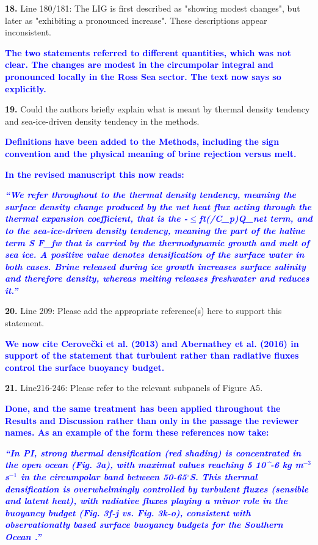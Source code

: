 \documentclass[pdflatex,sn-nature]{sn-jnl}
\begin{document}
\medskip
\noindent \textbf{18.} Line 180/181: The LIG is first described as "showing modest changes", but later as "exhibiting a pronounced increase". These descriptions appear inconsistent.
\medskip

\noindent\textcolor{blue}{\textbf{The two statements referred to different quantities, which was not clear. The changes are modest in the circumpolar integral and pronounced locally in the Ross Sea sector. The text now says so explicitly.}}


\medskip
\noindent \textbf{19.} Could the authors briefly explain what is meant by thermal density tendency and sea-ice-driven density tendency in the methods.
\medskip

\noindent\textcolor{blue}{\textbf{Definitions have been added to the Methods, including the sign convention and the physical meaning of brine rejection versus melt.}}


\noindent\textcolor{blue}{\textbf{In the revised manuscript this now reads:}}


\medskip
\noindent\textcolor{blue}{\textbf{\textit{``We refer throughout to the thermal density tendency, meaning the surface density change produced by the net heat flux acting through the thermal expansion coefficient, that is the -$\le$ft(/C\_p)Q\_net term, and to the sea-ice-driven density tendency, meaning the part of the haline term S F\_fw that is carried by the thermodynamic growth and melt of sea ice. A positive value denotes densification of the surface water in both cases. Brine released during ice growth increases surface salinity and therefore density, whereas melting releases freshwater and reduces it.''}}}
\medskip

\medskip
\noindent \textbf{20.} Line 209: Please add the appropriate reference(s) here to support this statement.
\medskip

\noindent\textcolor{blue}{\textbf{We now cite Cerove\v{c}ki et al. (2013) and Abernathey et al. (2016) in support of the statement that turbulent rather than radiative fluxes control the surface buoyancy budget.}}


\medskip
\noindent \textbf{21.} Line216-246: Please refer to the relevant subpanels of Figure A5.
\medskip

\noindent\textcolor{blue}{\textbf{Done, and the same treatment has been applied throughout the Results and Discussion rather than only in the passage the reviewer names. As an example of the form these references now take:}}


\medskip
\noindent\textcolor{blue}{\textbf{\textit{``In PI, strong thermal densification (red shading) is concentrated in the open ocean (Fig. 3a), with maximal values reaching 5 10\textasciicircum{}-6 kg m$^{-3}$ s$^{-1}$ in the circumpolar band between 50-65$^\circ$S. This thermal densification is overwhelmingly controlled by turbulent fluxes (sensible and latent heat), with radiative fluxes playing a minor role in the buoyancy budget (Fig. 3f-j vs. Fig. 3k-o), consistent with observationally based surface buoyancy budgets for the Southern Ocean .''}}}
\medskip
\end{document}
